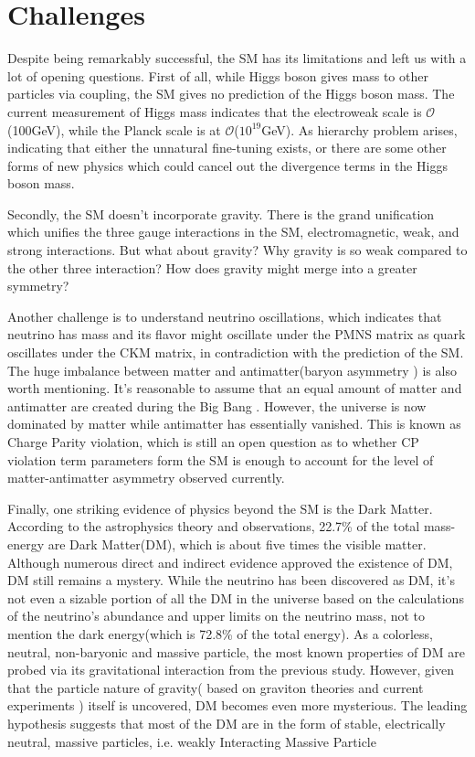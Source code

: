 \section{Challenges}
Despite being remarkably successful, the SM has its limitations and left us with a lot of opening questions.
First of all, while Higgs boson gives mass to other particles via coupling, the SM gives no prediction of the Higgs boson mass. 
The current measurement of Higgs mass indicates that the electroweak scale is $\mathcal{O}$(100GeV), while the Planck scale is at $\mathcal{O}$($10^{19}$GeV). 
As hierarchy problem arises, indicating that either the unnatural fine-tuning exists, or there are some other forms of new physics which could cancel out the divergence terms in the Higgs boson mass.

Secondly, the SM doesn’t incorporate gravity. There is the grand unification which unifies the three gauge interactions in the SM, electromagnetic, weak, and strong interactions. But what about gravity? Why gravity is so weak compared to the other three interaction?  How does gravity might merge into a greater symmetry?

Another challenge is to understand neutrino oscillations, which indicates that neutrino has mass and its flavor might oscillate under the PMNS matrix as quark oscillates under the CKM matrix, in contradiction with the prediction of the SM.
The huge imbalance between matter and antimatter(baryon asymmetry
) is also worth mentioning. It’s reasonable to assume that an equal amount of matter and antimatter are created during the Big Bang
. However, the universe is now dominated by matter while antimatter has essentially vanished. This is known as Charge Parity violation, which is still an open question as to whether CP violation term parameters form the SM is enough to account for the level of matter-antimatter asymmetry observed currently.

Finally, one striking evidence of physics beyond the SM is the Dark Matter.
According to the astrophysics theory and
 observations, 22.7\% of the total mass-energy are Dark Matter(DM), which is about five times the visible matter. Although numerous direct and indirect evidence approved 
 the existence of DM, DM still remains a mystery. While the neutrino has been discovered as DM, it’s not even a sizable portion of all the DM in the universe based on the calculations 
 of the neutrino’s abundance and upper limits on the neutrino mass, not to mention the dark energy(which is 72.8\% of the total energy).  As a colorless, neutral, non-baryonic and massive particle, the most known properties of DM are probed via its gravitational interaction from the previous study. However, given that the particle nature of gravity( based on graviton theories and current experiments ) itself is uncovered, DM becomes even more mysterious.
The leading hypothesis suggests that most of the DM are in the form of stable, electrically neutral, massive particles, i.e. weakly Interacting Massive Particle


